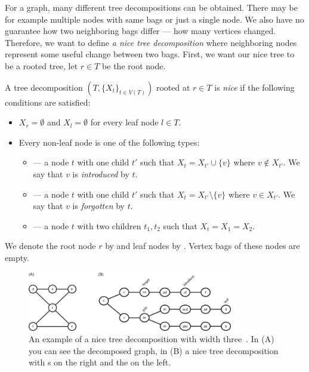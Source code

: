 For a graph, many different tree decompositions can be obtained.
There may be for example multiple nodes with same bags or just a single node.
We also have no guarantee how two neighboring bags differ --- how many vertices changed.
Therefore, we want to define \emph{a nice tree decomposition} where neighboring nodes
represent some useful change between two bags.
First, we want our nice tree to be a rooted tree,
let \( r \in T \) be the root node.
%
\begin{definition}
	A tree decomposition \newline
	\( (T, {\{X_t\}}_{t \in V ( T )}) \) rooted at \( r \in T \)
	is \emph{nice} if the following conditions are satisfied:
	\begin{itemize}
		\item \( X_r = \emptyset \) and \( X_l = \emptyset \) for every leaf node \( l \in T \).
		\item Every non-leaf node is one of the following types:
		      \begin{itemize}
			      \item \IntroduceVertexNode{} --- a node \( t \) with one child \( t' \)
			            such that \( X_t = X_{t'} \cup \{v\} \) where \( v \not\in X_{t'} \).
			            We say that \( v \) is \emph{introduced} by \( t \).
			      \item \ForgetVertexNode{} --- a node \( t \) with one child \( t' \)
			            such that \( X_t = X_{t'} \setminus \{v\} \) where \( v \in X_{t'} \).
			            We say that \( v \) is \emph{forgotten} by \( t \).
			      \item \JoinNode{} --- a node \( t \) with two children \( t_1, t_2 \)
			            such that \( X_t = X_1 = X_2 \).
		      \end{itemize}
	\end{itemize}
	We denote the root node \( r \) by \RootNode{} and leaf nodes by \LeafNode{}.
	Vertex bags of these nodes are empty.
\end{definition}
%
\begin{figure}[ht]
	\begin{center}
		\includegraphics[width=0.80\textwidth]{./assets/nice_tree_decomposition.png}
	\end{center}
	\caption[Nice tree decomposition]{An example of a nice tree decomposition with width three~\cite{nice_tree_decomposition_img}.
		In (A) you can see the decomposed graph, in (B) a nice tree decomposition
		with \LeafNode{}s on the right and the \RootNode{} on the left.
	}%
	\label{fig:nice_tree_decomposition}
\end{figure}

